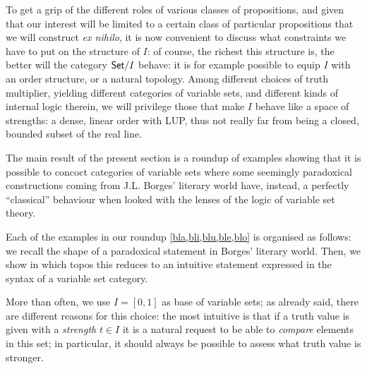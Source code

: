 To get a grip of the different roles of various classes of propositions, and given that our interest will be limited to a certain class of particular propositions that we will construct \emph{ex nihilo}, it is now convenient to discuss what constraints we have to put on the structure of $I$: of course, the richest this structure is, the better will the category $\mathsf{Set}/I$ behave: it is for example possible to equip $I$ with an order structure, or a natural topology. Among different choices of truth multiplier, yielding different categories of variable sets, and different kinds of internal logic therein, we will privilege those that make $I$ behave like a space of strengths: a dense, linear order with LUP, thus not really far from being a closed, bounded subset of the real line. 

The main result of the present section is a roundup of examples showing that it is possible to concoct categories of variable sets where some seemingly paradoxical constructions coming from J.L. Borges' literary world have, instead, a perfectly ``classical'' behaviour when looked with the lenses of the logic of variable set theory.

Each of the examples in our roundup \ref{bla,bli,blu,ble,blo} is organised as follows: we recall the shape of a paradoxical statement in Borges' literary world. Then, we show in which topos this reduces to an intuitive statement expressed in the syntax of a variable set category.

More than often, we use $I=[0,1]$ as base of variable sets; as already said, there are different reasons for this choice: the most intuitive is that if a truth value is given with a \emph{strength} $t\in I$ it is a natural request to be able to \emph{compare} elements in this set; in particular, it should always be possible to assess what truth value is stronger. 

